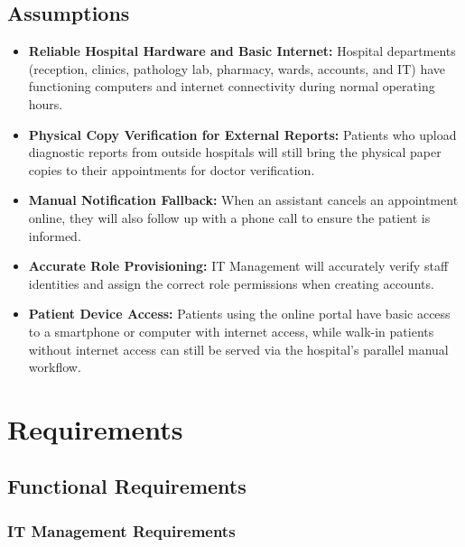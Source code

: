 \documentclass[11pt,a4paper]{article}
\begin{document}
\subsection{Assumptions}
\begin{itemize}
    \item \textbf{Reliable Hospital Hardware and Basic Internet:} Hospital departments (reception, clinics, pathology lab, pharmacy, wards, accounts, and IT) have functioning computers and internet connectivity during normal operating hours.

    \item \textbf{Physical Copy Verification for External Reports:} Patients who upload diagnostic reports from outside hospitals will still bring the physical paper copies to their appointments for doctor verification.

    \item \textbf{Manual Notification Fallback:} When an assistant cancels an appointment online, they will also follow up with a phone call to ensure the patient is informed.

    \item \textbf{Accurate Role Provisioning:} IT Management will accurately verify staff identities and assign the correct role permissions when creating accounts.

    \item \textbf{Patient Device Access:} Patients using the online portal have basic access to a smartphone or computer with internet access, while walk-in patients without internet access can still be served via the hospital's parallel manual workflow.
\end{itemize}

\section{Requirements}

\subsection{Functional Requirements}
\subsubsection{IT Management Requirements}
\end{document}
